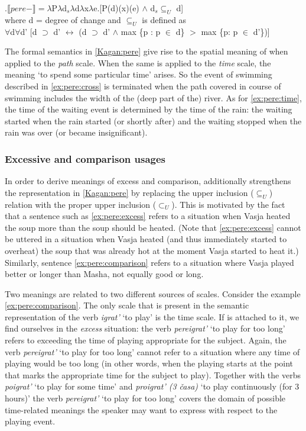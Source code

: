 \ex.\label{Kagan:pere}$\llbracket pere- \rrbracket = \lambda$P$\lambda$d$_s\lambda$d$\lambda$x$\lambda$e.[P(d)(x)(e) $\wedge$ d$_s \subseteq _U$ d]\\
where d = degree of change \citep{KennedyLevin:02} and $\subseteq _U$ is defined as\\
$\forall$d$\forall$d' [d $\supset$ d' $\leftrightarrow$ (d $\supset$ d' $\wedge$ max \{p : p $\in$ d\} $>$ max \{p: p $\in$ d'\})]\\

The formal semantics in \ref{Kagan:pere} give rise to the spatial meaning of  when applied to the \textit{path} scale. When the same is applied to the \textit{time} scale, the meaning `to spend some particular time' arises. So the event of swimming described in \ref{ex:pere:cross} is terminated when the path covered in course of swimming includes the width of the (deep part of the) river. As for \ref{ex:pere:time}, the time of the waiting event is determined by the time of the rain: the waiting started when the rain started (or shortly after) and the waiting stopped when the rain was over (or became insignificant).

\subsubsection{Excessive and comparison usages}
In order to derive meanings of excess and comparison, \citet[133]{Kagan:book} additionally strengthens the representation in \ref{Kagan:pere} by replacing the upper inclusion ($\subseteq _U$) relation with the proper upper inclusion ($\subset _U$). This is motivated by the fact that a sentence such as \ref{ex:pere:excess} refers to a situation when Vasja heated the soup more than the soup should be heated. (Note that \ref{ex:pere:excess} cannot be uttered in a situation when Vasja heated (and thus immediately started to overheat) the soup that was already hot at the moment Vasja started to heat it.) Similarly, sentence \ref{ex:pere:comparison} refers to a situation where Vasja played better or longer than Masha, not equally good or long.

Two meanings are related to two different sources of scales. Consider the example \ref{ex:pere:comparison}. The only scale that is present in the semantic representation of the verb \textit{igrat'} `to play' is the time scale. If  is attached to it, we find ourselves in the \textit{excess} situation: the verb \textit{pereigrat'} `to play for too long' refers to exceeding the time of playing appropriate for the subject. Again, the verb \textit{pereigrat'} `to play for too long' cannot refer to a situation where any time of playing would be too long (in other words, when the playing starts at the point that marks the appropriate time for the subject to play). Together with the verbs \textit{poigrat'} `to play for some time' and \textit{proigrat' (3 \v{c}asa)} `to play continuously (for 3 hours)' the verb \textit{pereigrat'} `to play for too long' covers the domain of possible time-related meanings the speaker may want to express with respect to the playing event.

